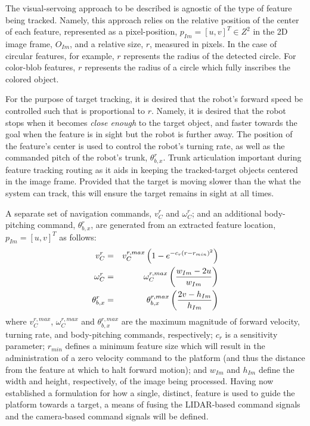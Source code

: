 			The visual-servoing approach to be described is agnostic of the type of feature being tracked. Namely, this approach relies on the relative position of the center of each feature, represented as a pixel-position, $p_{Im} = [u,v]^{T} \in Z^{2}$ in the 2D image frame, $O_{Im}$, and a relative size, $r$, measured in pixels. In the case of circular features, for example, $r$ represents the radius of the detected circle. For color-blob features, $r$ represents the radius of a circle which fully inscribes the colored object.

			For the purpose of target tracking, it is desired that the robot's forward speed be controlled such that is proportional to $r$. Namely, it is desired that the robot stops when it becomes \emph{close enough} to the target object, and faster towards the goal when the feature is in sight but the robot is further away. The position of the feature's center is used to control the robot's turning rate, as well as the commanded pitch of the robot's trunk, $\theta_{b,x}^{r}$. Trunk articulation important during feature tracking routing as it aids in keeping the tracked-target objects centered in the image frame. Provided that the target is moving slower than the what the system can track, this will ensure the target remains in sight at all times.

			A separate set of navigation commands, $v_{C}^{r}$ and $\omega_{C}^{r}$; and an additional body-pitching command, $\theta_{b,x}^{r}$,  are generated from an extracted feature location, $p_{Im} = [u,v]^{T}$ as follows: 
				\begin{eqnarray}
					v_{C}^{r} 			& = & v_{C}^{r,max} \left( 1 - e^{ -c_{r} \left( r-r_{min} \right)^{2} } \right) 	\nonumber 	\\
					\omega_{C}^{r} 	& = & \omega_{C}^{r,max} \left(\frac{ w_{Im} - 2 u  }{ w_{Im} } \right)		\nonumber 	\\
					\theta_{b,x}^{r}	& = & \theta_{b,x}^{r,max} \left( \frac{ 2 v - h_{Im} }{ h_{Im} } \right) 		
				\end{eqnarray}
			where $v_{C}^{r,max}$, $\omega_{C}^{r,max}$ and $\theta_{b,x}^{r,max}$ are the maximum magnitude of forward velocity, turning rate, and body-pitching commands, respectively; $c_{r}$ is a sensitivity parameter; $r_{min}$ defines a minimum feature size which will result in the administration of a zero velocity command to the platform (and thus the distance from the feature at which to halt forward motion); and $w_{Im}$ and $h_{Im}$ define the width and height, respectively, of the image being processed. Having now established a formulation for how a single, distinct, feature is used to guide the platform towards a target, a means of fusing the LIDAR-based command signals and the camera-based command signals will be defined.

